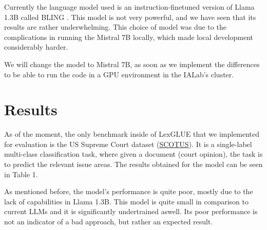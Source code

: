 \documentclass[11pt]{article}
\begin{document}
Currently the language model used is an instruction-finetuned version of Llama 1.3B \cite{touvron2023llama1} called BLING \cite{xia2023sheared}. This model is not very powerful, and we have seen that its results are rather underwhelming. This choice of model was due to the complications in running the Mistral 7B locally, which made local development considerably harder.

We will change the model to Mistral 7B, as soon as we implement the differences to be able to run the code in a GPU environment in the IALab's cluster.


\section{Results}

As of the moment, the only benchmark inside of LexGLUE that we implemented for evaluation is the US Supreme Court dataset (\href{http://scdb.wustl.edu/}{SCOTUS}). It is a single-label multi-class classification task, where given a document (court opinion), the task is to predict the relevant issue areas. The results obtained for the model can be seen in Table 1.

As mentioned before, the model's performance is quite poor, mostly due to the lack of capabilities in Llama 1.3B. This model is quite small in comparison to current LLMs and it is significantly undertrained aswell. Its poor performance is not an indicator of a bad approach, but rather an expected result.
\end{document}
